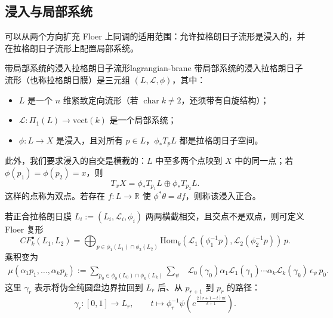 
\subsection{浸入与局部系统}\label{subsec:immersions-local-systems}
可以从两个方向扩充 Floer 上同调的适用范围：允许拉格朗日子流形是浸入的，并在拉格朗日子流形上配置局部系统。

\begin{definition}{带局部系统的浸入拉格朗日子流形}{lagrangian-brane}
带局部系统的浸入拉格朗日子流形（也称拉格朗日膜）是三元组 $(L,\mathcal L,\phi)$，其中：
\begin{itemize}
  \item $L$ 是一个 $n$ 维紧致定向流形（若 $\operatorname{char}k\ne2$，还须带有自旋结构）；
  \item $\mathcal L\colon\Pi_1(L)\to\mathrm{vect}(k)$ 是一个局部系统；
  \item $\phi\colon L\to X$ 是浸入，且对所有 $p\in L$，$\phi_*T_pL$ 都是拉格朗日子空间。
\end{itemize}
此外，我们要求浸入的自交是横截的：$L$ 中至多两个点映到 $X$ 中的同一点；若 $\phi(p_1)=\phi(p_2)=x$，则
\[
  T_xX=\phi_*T_{p_1}L\oplus\phi_*T_{p_2}L.
\]
这样的点称为双点。若存在 $f\colon L\to\mathbb R$ 使 $\phi^*\theta=df$，则称该浸入正合。
\end{definition}

若正合拉格朗日膜 $L_i:=(L_i,\mathcal L_i,\phi_i)$ 两两横截相交，且交点不是双点，则可定义 Floer 复形
\[
  CF_k^\bullet(L_1,L_2)=
  \bigoplus_{p\in\phi_1(L_1)\cap\phi_2(L_2)}
  \mathrm{Hom}_k\!\left(\mathcal L_1(\phi_1^{-1}p),
                        \mathcal L_2(\phi_2^{-1}p)\right)\,p.
\]
乘积变为
\[
  \begin{aligned}
  \mu(\alpha_1p_1,\ldots,\alpha_kp_k)
  :=\sum_{p_0\in\phi_0(L_0)\cap\phi_k(L_k)}\sum_\psi
  &\mathcal L_0(\gamma_0)\alpha_1\mathcal L_1(\gamma_1)\cdots
   \alpha_k\mathcal L_k(\gamma_k)\,\epsilon_\psi\,p_0.
  \end{aligned}
\]
这里 $\gamma_r$ 表示将伪全纯圆盘边界拉回到 $L_r$ 后、从 $p_{r+1}$ 到 $p_r$ 的路径：
\[
  \gamma_r\colon[0,1]\to L_r,\qquad
  t\longmapsto\phi_r^{-1}\psi\!\left(e^{\frac{2(r+1-t)\pi i}{k+1}}\right).
\]

